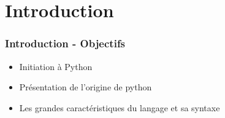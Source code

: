 \section{Introduction}

\begin{frame}
  \frametitle{Introduction - Objectifs}
  \begin{itemize}
    \item Initiation à Python
    \item Présentation de l'origine de python
    \item Les grandes caractéristiques du langage et sa syntaxe
  \end{itemize}

\end{frame}

\newpage
